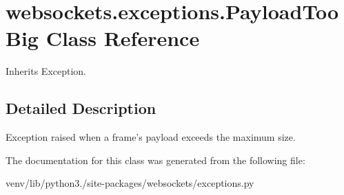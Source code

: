\hypertarget{classwebsockets_1_1exceptions_1_1_payload_too_big}{}\section{websockets.\+exceptions.\+Payload\+Too\+Big Class Reference}
\label{classwebsockets_1_1exceptions_1_1_payload_too_big}


Inherits Exception.



\subsection{Detailed Description}
\begin{DoxyVerb}Exception raised when a frame's payload exceeds the maximum size.\end{DoxyVerb}
 

The documentation for this class was generated from the following file\+:\begin{DoxyCompactItemize}
\item 
venv/lib/python3./site-\/packages/websockets/exceptions.\+py\end{DoxyCompactItemize}
